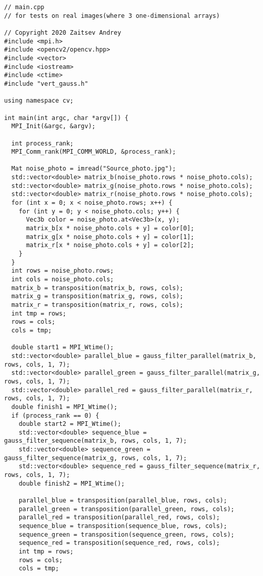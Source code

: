 \documentclass{report}
\begin{document}
\begin{lstlisting}
// main.cpp
// for tests on real images(where 3 one-dimensional arrays)

// Copyright 2020 Zaitsev Andrey
#include <mpi.h>
#include <opencv2/opencv.hpp>
#include <vector>
#include <iostream>
#include <ctime>
#include "vert_gauss.h"

using namespace cv;

int main(int argc, char *argv[]) {
  MPI_Init(&argc, &argv);

  int process_rank;
  MPI_Comm_rank(MPI_COMM_WORLD, &process_rank);

  Mat noise_photo = imread("Source_photo.jpg");
  std::vector<double> matrix_b(noise_photo.rows * noise_photo.cols);
  std::vector<double> matrix_g(noise_photo.rows * noise_photo.cols);
  std::vector<double> matrix_r(noise_photo.rows * noise_photo.cols);
  for (int x = 0; x < noise_photo.rows; x++) {
    for (int y = 0; y < noise_photo.cols; y++) {
      Vec3b color = noise_photo.at<Vec3b>(x, y);
      matrix_b[x * noise_photo.cols + y] = color[0];
      matrix_g[x * noise_photo.cols + y] = color[1];
      matrix_r[x * noise_photo.cols + y] = color[2];
    }
  }
  int rows = noise_photo.rows;
  int cols = noise_photo.cols;
  matrix_b = transposition(matrix_b, rows, cols);
  matrix_g = transposition(matrix_g, rows, cols);
  matrix_r = transposition(matrix_r, rows, cols);
  int tmp = rows;
  rows = cols;
  cols = tmp;

  double start1 = MPI_Wtime();
  std::vector<double> parallel_blue = gauss_filter_parallel(matrix_b, rows, cols, 1, 7);
  std::vector<double> parallel_green = gauss_filter_parallel(matrix_g, rows, cols, 1, 7);
  std::vector<double> parallel_red = gauss_filter_parallel(matrix_r, rows, cols, 1, 7);
  double finish1 = MPI_Wtime();
  if (process_rank == 0) {
    double start2 = MPI_Wtime();
    std::vector<double> sequence_blue = gauss_filter_sequence(matrix_b, rows, cols, 1, 7);
    std::vector<double> sequence_green = gauss_filter_sequence(matrix_g, rows, cols, 1, 7);
    std::vector<double> sequence_red = gauss_filter_sequence(matrix_r, rows, cols, 1, 7);
    double finish2 = MPI_Wtime();

    parallel_blue = transposition(parallel_blue, rows, cols);
    parallel_green = transposition(parallel_green, rows, cols);
    parallel_red = transposition(parallel_red, rows, cols);
    sequence_blue = transposition(sequence_blue, rows, cols);
    sequence_green = transposition(sequence_green, rows, cols);
    sequence_red = transposition(sequence_red, rows, cols);
    int tmp = rows;
    rows = cols;
    cols = tmp;


\end{lstlisting}
\end{document}
